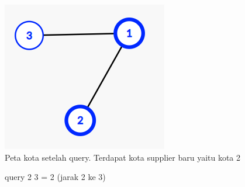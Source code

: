 \documentclass{article}
\begin{document}
\begin{center}
\includegraphics{kedua.PNG}\\
Peta kota setelah query. Terdapat kota supplier baru yaitu kota 2
\end{center}

query 2 3 = 2 (jarak 2 ke 3)\\
\end{document}
